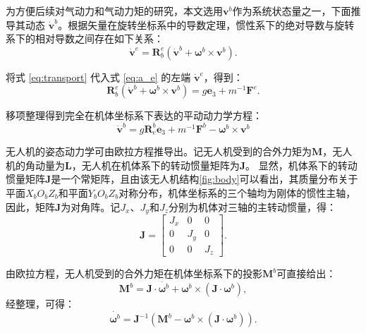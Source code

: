 为方便后续对气动力和气动力矩的研究，本文选用$\boldsymbol{v}^b$作为系统状态量之一，下面推导其动态 $\dot{\boldsymbol{v}}^b$。根据矢量在旋转坐标系中的导数定理，惯性系下的绝对导数与旋转系下的相对导数之间存在如下关系：
\begin{equation}
    \dot{\boldsymbol{v}}^e = \boldsymbol{R}_b^e(\dot{\boldsymbol{v}}^b + \boldsymbol{\omega}^{b} \times \boldsymbol{v}^b).
    \label{eq:transport}
\end{equation}

将式 \eqref{eq:transport} 代入式 \eqref{eq:a_e} 的左端 $\dot{\boldsymbol{v}}^e$，得到：
\begin{equation}
    \boldsymbol{R}_b^e(\dot{\boldsymbol{v}}^b + \boldsymbol{\omega}^{b} \times \boldsymbol{v}^b) = g\boldsymbol{e}_{3} + m^{-1} \boldsymbol{F}^e.
\end{equation}

移项整理得到完全在机体坐标系下表达的平动动力学方程：
\begin{equation}
    \dot{\boldsymbol{v}}^b = g\boldsymbol{R}_e^b\boldsymbol{e}_3 + m^{-1} \boldsymbol{F}^b - \boldsymbol{\omega}^b \times \boldsymbol{v}^b
    \label{eq:d_vel}
\end{equation}

无人机的姿态动力学可由欧拉方程推导出。记无人机受到的合外力矩为$\boldsymbol{M}$，无人机的角动量为$\boldsymbol{L}$，无人机在机体系下的转动惯量矩阵为$\boldsymbol{J}$。
显然，机体系下的转动惯量矩阵$\boldsymbol{J}$是一个常矩阵，且由该无人机结构\ref{fig:body}可以看出，其质量分布关于平面$X_b O_b Z_b$和平面$Y_b O_b Z_b$对称分布，机体坐标系的三个轴均为刚体的惯性主轴，因此，矩阵$\boldsymbol{J}$为对角阵\cite{quan2018}。记$J_x$、$J_y$和$J_z$分别为机体对三轴的主转动惯量，得：
\begin{equation}
    \boldsymbol{J} = 
    \begin{bmatrix}
        J_x & 0 & 0 \\
        0 & J_y & 0 \\
        0 & 0 & J_z
    \end{bmatrix}.
\end{equation}

由欧拉方程，无人机受到的合外力矩在机体坐标系下的投影$\boldsymbol{M}^b$可直接给出：
\begin{equation}
    \boldsymbol{M}^b = \boldsymbol{J}\cdot\dot{\boldsymbol{\omega}^b}+\boldsymbol{\omega}^b\times(\boldsymbol{J}\cdot\boldsymbol{\omega}^b),
\end{equation}
经整理，可得：
\begin{equation}
    \dot{\boldsymbol{\omega}^b} = \boldsymbol{J}^{-1}(\boldsymbol{M}^b - \boldsymbol{\omega}^b\times(\boldsymbol{J}\cdot\boldsymbol{\omega}^b)).
    \label{eq:d_omega}
\end{equation}


